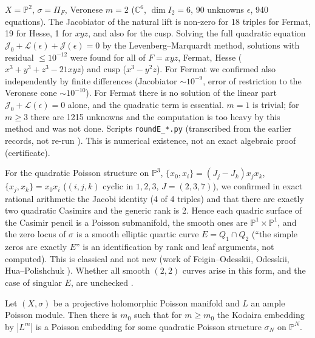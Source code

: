 \begin{obs}[$\mathbb P^2$, cubic, $m=2$: numerical confirmation \tV]\label{obs:P2}
$X=\mathbb P^2$, $\sigma=\Pi_F$, Veronese $m=2$ ($\mathbb C^6$, $\dim I_2=6$, 90 unknowns $\epsilon$, 940 equations). The Jacobiator of the natural lift is non-zero for 18 triples for Fermat, 19 for Hesse, 1 for $xyz$, and also for the cusp. Solving the full quadratic equation $\mathcal J_0+\mathcal L(\epsilon)+\mathcal J(\epsilon)=0$ by the Levenberg--Marquardt method, solutions with residual $\le10^{-12}$ were found for all of $F=xyz$, Fermat, Hesse ($x^3+y^3+z^3-21xyz$) and cusp ($x^3-y^2z$). For Fermat we confirmed also independently by finite differences (Jacobiator $\sim10^{-9}$, error of restriction to the Veronese cone $\sim10^{-10}$). For Fermat there is no solution of the linear part $\mathcal J_0+\mathcal L(\epsilon)=0$ alone, and the quadratic term is essential. $m=1$ is trivial; for $m\ge3$ there are 1215 unknowns and the computation is too heavy by this method and was not done. Scripts \texttt{roundE\_*.py} (transcribed from the earlier records, not re-run \tQ). This is numerical existence, not an exact algebraic proof (certificate).
\end{obs}
\begin{obs}[Segre embedding of $\mathbb P^1\times\mathbb P^1$ ($m=1$): Sklyanin-type structure \tV]\label{obs:Segre}
For the quadratic Poisson structure on $\mathbb P^3$, $\{x_0,x_i\}=(J_j-J_k)x_jx_k$, $\{x_j,x_k\}=x_0x_i$ ($(i,j,k)$ cyclic in $1,2,3$, $J=(2,3,7)$), we confirmed in exact rational arithmetic the Jacobi identity (4 of 4 triples) and that there are exactly two quadratic Casimirs and the generic rank is 2. Hence each quadric surface of the Casimir pencil is a Poisson submanifold, the smooth ones are $\mathbb P^1\times\mathbb P^1$, and the zero locus of $\sigma$ is a smooth elliptic quartic curve $E=Q_1\cap Q_2$ (``the simple zeros are exactly $E$'' is an identification by rank and leaf arguments, not computed). This is classical and not new (work of Feigin--Odesskii, Odesskii, Hua--Polishchuk \tC \tQ). Whether all smooth $(2,2)$ curves arise in this form, and the case of singular $E$, are unchecked \tK.
\end{obs}
\begin{conj}\tK\label{conj:PK}
Let $(X,\sigma)$ be a projective holomorphic Poisson manifold and $L$ an ample Poisson module. Then there is $m_0$ such that for $m\ge m_0$ the Kodaira embedding by $|L^m|$ is a Poisson embedding for some quadratic Poisson structure $\sigma_N$ on $\mathbb P^N$.
\end{conj}

